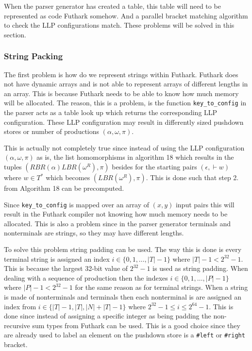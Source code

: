 When the parser generator has created a table, this table will need to be represented as code Futhark somehow. And a parallel bracket matching algorithm to check the LLP configurations match. These problems will be solved in this section.
\subsubsection{String Packing}
The first problem is how do we represent strings within Futhark. Futhark does not have dynamic arrays and is not able to represent arrays of different lengths in an array. This is because Futhark needs to be able to know how much memory will be allocated. The reason, this is a problem, is the function \lstinline|key_to_config| in the parser acts as a table look up which returns the corresponding LLP configuration. These LLP configuration may result in differently sized pushdown stores or number of productions $(\alpha, \omega, \pi)$.

This is actually not completely true since instead of using the LLP configuration $(\alpha, \omega, \pi)$ as is, the list homomorphisms in algorithm 18 \cite[18]{Vagner2007} which results in the tuples $(RBR(\alpha)LBR(\omega^R), \pi)$ besides for the starting pairs $(\epsilon, \vdash w)$ where $w \in T^*$ which becomes $(LBR(\omega^R), \pi)$. This is done such that step 2. from Algorithm 18 \cite[18]{Vagner2007} can be precomputed.

Since \lstinline|key_to_config| is mapped over an array of $(x,y)$ input pairs this will result in the Futhark compiler not knowing how much memory needs to be allocated. This is also a problem since in the parser generator terminals and nonterminals are strings, so they may have different lengths.

To solve this problem string padding can be used. The way this is done is every terminal string is assigned an index $i \in \{0, 1, \dots, |T| - 1\}$ where $|T| - 1 < 2^{32} - 1$. This is because the largest 32-bit value of $2^{32} - 1$ is used as string padding. When dealing with a sequence of production then the indexes $i \in \{0, 1, \dots, |P| - 1\}$ where $|P| - 1 < 2^{32} - 1$ for the same reason as for terminal strings. When a string is made of nonterminals and terminals then each nonterminal is are assigned an index from $i \in \{|T| - 1, |T|, |N| + |T| - 1\}$ where $2^{32} - 1 \leq i \leq 2^{64} - 1$. This is done since instead of assigning a specific integer as being padding the non-recursive sum types from Futhark can be used. This is a good choice since they are already used to label an element on the pushdown store is a \lstinline|#left| or \lstinline|#right| bracket.

